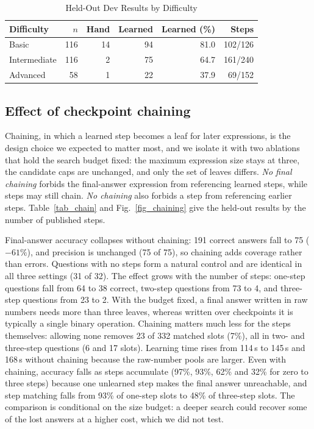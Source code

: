\documentclass[conference]{IEEEtran}
\begin{document}
\begin{table}[!t]
\renewcommand{\arraystretch}{1.25}
\caption{Held-Out Dev Results by Difficulty}
\label{tab_difficulty}
\centering
\begin{tabular}{lrrrrr}
\hline
\bfseries Difficulty & \bfseries $n$ & \bfseries Hand & \bfseries Learned & \bfseries Learned (\%) & \bfseries Steps\\
\hline\hline
Basic & 116 & 14 & 94 & 81.0 & 102/126\\
Intermediate & 116 & 2 & 75 & 64.7 & 161/240\\
Advanced & 58 & 1 & 22 & 37.9 & 69/152\\
\hline
\end{tabular}
\end{table}

\subsection{Effect of checkpoint chaining}
\label{sub_chain}
Chaining, in which a learned step becomes a leaf for later expressions, is the
design choice we expected to matter most, and we isolate it with two ablations
that hold the search budget fixed: the maximum expression size stays at three,
the candidate caps are unchanged, and only the set of leaves differs.
\emph{No final chaining} forbids the final-answer expression from referencing
learned steps, while steps may still chain. \emph{No chaining} also forbids a
step from referencing earlier steps. Table~\ref{tab_chain} and
Fig.~\ref{fig_chaining} give the held-out results by the number of published
steps.

Final-answer accuracy collapses without chaining: 191 correct answers fall to
75 ($-61\%$), and precision is unchanged (75 of 75), so chaining adds coverage
rather than errors. Questions with no steps form a natural control and are
identical in all three settings (31 of 32). The effect grows with the number of
steps: one-step questions fall from 64 to 38 correct, two-step questions from 73
to 4, and three-step questions from 23 to 2. With the budget fixed, a final
answer written in raw numbers needs more than three leaves, whereas written over
checkpoints it is typically a single binary operation. Chaining matters much
less for the steps themselves: allowing none removes 23 of 332 matched slots
(7\%), all in two- and three-step questions (6 and 17 slots). Learning time rises
from 114\,s to 145\,s and 168\,s without chaining because the raw-number pools
are larger. Even with chaining, accuracy falls as steps accumulate (97\%, 93\%,
62\% and 32\% for zero to three steps) because one unlearned step makes the final
answer unreachable, and step matching falls from 93\% of one-step slots to 48\%
of three-step slots. The comparison is conditional on the size budget: a deeper
search could recover some of the lost answers at a higher cost, which we did not
test.
\end{document}
